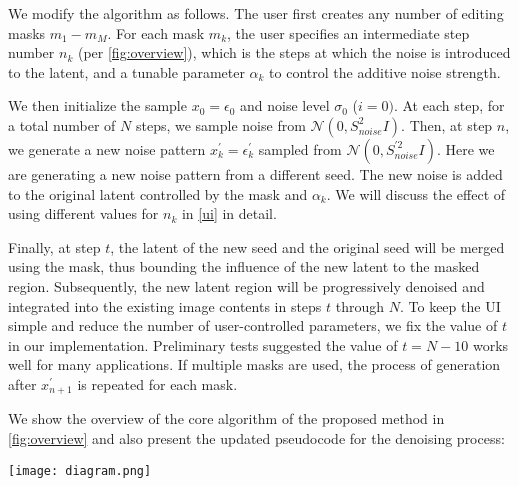 \documentclass[10pt,twocolumn,letterpaper]{article}
\begin{document}
We modify the algorithm as follows. The user first creates any number of editing masks $m_1-m_M$. For each mask $m_k$, the user specifies an intermediate step number $n_k$ (per \cref{fig:overview}), which is the steps at which the noise is introduced to the latent, and a tunable parameter $\alpha_k$ to control the additive noise strength.

We then initialize the sample $x_0 = \epsilon_0$ and noise level $\sigma_0$ ($i = 0)$. At each step, for a total number of $N$ steps, we sample noise from $\mathcal{N}(0, S^2_{noise}I)$. Then, at step $n$,  we generate a new noise pattern $x^{\prime}_k  = \epsilon^{\prime}_k$ sampled from  $\mathcal{N}(0, S^{\prime2}_{noise}I)$. Here we are generating a new noise pattern from a different seed. The new noise is added to the original latent controlled by the mask and $\alpha_k$. We will discuss the effect of using different values for $n_k$ in \cref{ui} in detail. 

Finally, at step $t$, the latent of the new seed and the original seed will be merged using the mask, thus bounding the influence of the new latent to the masked region. Subsequently, the new latent region will be progressively denoised and integrated into the existing image contents in steps $t$ through $N$. To keep the UI simple and reduce the number of user-controlled parameters, we fix the value of $t$ in our implementation. Preliminary tests suggested the value of $t = N - 10$ works well for many applications. If multiple masks are used, the process of generation after $x^{\prime}_{n+1}$ is repeated for each mask.

We show the overview of the core algorithm of the proposed method in \cref{fig:overview} and also present the updated pseudocode for the denoising process:

\begin{figure*}[!ht]
    \centering
    \texttt{[image: diagram.png]}
    \caption{Overview of the proposed method: The top row shows the typical DM generation of an image using a seed $S$ and a prompt $P$. The bottom shows the overview of the proposed method: the algorithm takes a new seed $S'$, and combines it with the original latent at step $n$ using a mask $m$, and a strength control $alpha$. The diffusion process moves forward and at a certain step $t$ (we fix $t$ = $N-10$) the original latent and the new modified latent are merged together using the masking and finally the fine-tuned image is generated. }
    \label{fig:overview}
\end{figure*}
\end{document}

